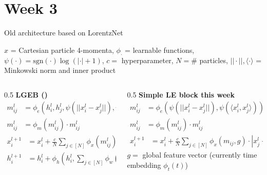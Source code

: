 \documentclass[handout, aspectratio=169,xcolor=dvipsnames]{beamer}
\begin{document}
\section{Week 3}


\begin{frame}{Old architecture based on LorentzNet}

    $x$ = Cartesian particle 4-momenta, $\phi_\cdot$ = learnable functions, $\psi(\cdot) = \text{sgn}(\cdot) \log(|\cdot| + 1)$, $c = $ hyperparameter, $N = \#$ particles, $|| \cdot ||, \langle \cdot \rangle$ = Minkowski norm and inner product
    \vspace{0.5cm}
    \begin{columns}
        \begin{column}{0.5\textwidth}
            \textbf{LGEB (\cite{gongEfficientLorentzEquivariant2022})}
            \begin{align*}
                m_{ij}^l &= \phi_e(h_i^l, h_j^l, \psi(||x_i^l - x_j^l||), \psi(\langle x_i^l, x_j^l \rangle)) \\
                m_{ij}^l &= \phi_m(m_{ij}^l) \cdot m_{ij}^l
            \end{align*}
            \begin{align*}
                x_i^{l+1} &= x_i^l + \frac{c}{N} \sum\limits_{j \in [N]} \phi_x(m_{ij}^l) \cdot |x_i - x_j|         
            \end{align*}
            \begin{align*}
                h_i^{l+1} &= h_i^l + \phi_h(h_i^l, \sum\limits_{j \in [N]} \phi_w(m_{ij}^l) m_{ij}^l)
            \end{align*}
        \end{column}
        \begin{column}{0.5\textwidth}
            \textbf{Simple LE block this week}
            \begin{align*}
                m^l_{ij} &= \phi_e(\psi(||x_i^l - x_j^l||), \psi(\langle x_i^l, x_j^l \rangle))\\
                m^l_{ij} &= \phi_m(m^l_{ij}) \cdot m^l_{ij}
            \end{align*}
            \begin{align*}
                x_i^{l+1} &= x_i^l + \frac{c}{N} \sum\limits_{j \in [N]} \phi_x(m_{ij}, g) \cdot |x_j^l - x_i^l|
            \end{align*}
            $g = $ global feature vector (currently time embedding $\phi_t(t)$)
        \end{column}
    \end{columns}
\end{frame}
\end{document}
